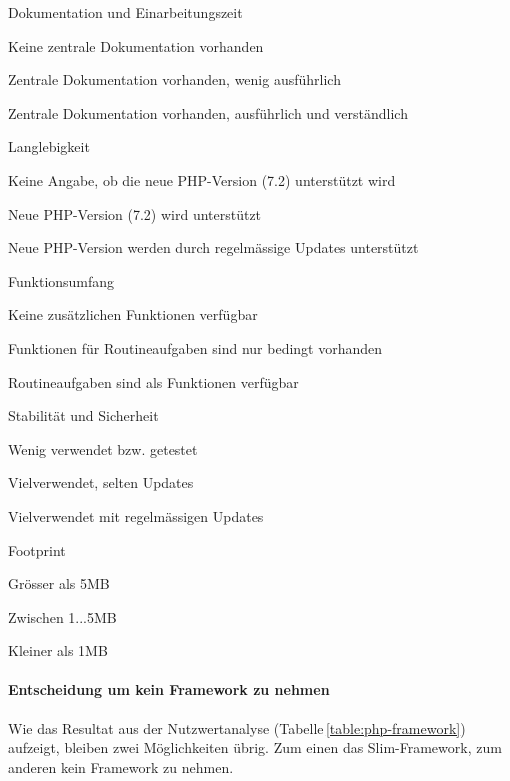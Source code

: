 \begin{itemize*}
\item Dokumentation und Einarbeitungszeit
  \begin{enumerate*}
  \item Keine zentrale Dokumentation vorhanden
  \item Zentrale Dokumentation vorhanden, wenig ausführlich
  \item Zentrale Dokumentation vorhanden, ausführlich und verständlich
  \end{enumerate*}
\item Langlebigkeit
  \begin{enumerate*}
  \item Keine Angabe, ob die neue PHP-Version (7.2) unterstützt wird
  \item Neue PHP-Version (7.2) wird unterstützt
  \item Neue PHP-Version werden durch regelmässige Updates unterstützt
  \end{enumerate*}
\item Funktionsumfang
  \begin{enumerate*}
  \item Keine zusätzlichen Funktionen verfügbar
  \item Funktionen für Routineaufgaben sind nur bedingt vorhanden
  \item Routineaufgaben sind als Funktionen verfügbar
  \end{enumerate*}
\item Stabilität und Sicherheit
  \begin{enumerate*}
  \item Wenig verwendet bzw. getestet
  \item Vielverwendet, selten Updates
  \item Vielverwendet mit regelmässigen Updates
  \end{enumerate*}
\item Footprint
  \begin{enumerate*}
  \item Grösser als 5MB
  \item Zwischen 1...5MB
  \item Kleiner als 1MB
  \end{enumerate*}
\end{itemize*}


\paragraph*{Entscheidung um kein Framework zu nehmen}
Wie das Resultat aus der Nutzwertanalyse (Tabelle\,\ref{table:php-framework}) aufzeigt, bleiben zwei Möglichkeiten übrig. Zum einen das Slim-Framework, zum anderen kein Framework zu nehmen.

